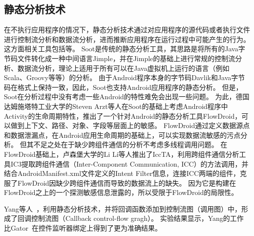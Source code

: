 \subsection{静态分析技术}
在不执行应用程序的情况下，静态分析技术通过对应用程序的源代码或者执行文件进行控制流分析和数据流分析，进而推断应用程序在运行过程中可能产生的行为。
这方面相关工具包括\cite{vallee1999soot,arzt2014flowdroid,AmanDroid,iccta,androguard:online}等。
Soot\cite{vallee1999soot}是传统的静态分析工具，其思路是将所有的Java字节码文件转化成一种中间语言Jimple，并在Jimple的基础上进行常规的控制流分析、数据流分析，理论上适用于所有可以在Java虚拟机上运行的语言（例如Scala、Groovy等等）的分析。
由于Android程序本身的字节码Davlik和Java字节码在格式上保持一致，因此，Soot也支持Android应用程序的静态分析。
但是，Soot在分析过程中没有考虑一些Android的特性难免会出现一些问题。
为此，德国达姆施塔特工业大学的Steven Arzt等人在Soot的基础上考虑Android程序中Activity的生命周期特性，推出了一个针对Android的静态分析工具FlowDroid\cite{arzt2014flowdroid}，可以做到上下文、路径、对象、字段等层面上的敏感。
FlowDroid通过定义数据源点和数据泄漏点，在Android应用生命周期的基础上，可以实现数据流敏感的污点分析。
但其不足之处在于缺少跨组件通信的分析不考虑多线程调用问题。
在FlowDroid基础上，卢森堡大学的Li Li等人推出了IccTA\cite{iccta}，利用跨组件通信分析工具IC3提取跨组件通信（Inter-Component Communication, ICC）的方法调用，并结合AndroidManifest.xml文件定义的Intent Filter信息，连接ICC两端的组件，克服了FlowDroid因缺少跨组件通信而导致的数据流上的缺失。
因为它是构建在FlowDroid之上的一个探测敏感信息泄露的，所以受限于FlowDroid的局限性。

Yang等人~\cite{yang2015static}，利用静态分析技术，并将回调函数添加到控制流图（调用图）中，形成了回调控制流图（Callback control-flow gragh）。
实验结果显示，Yang的工作比Gator~\cite{rountev2014static}在控件监听器绑定上得到了更为准确结果。





